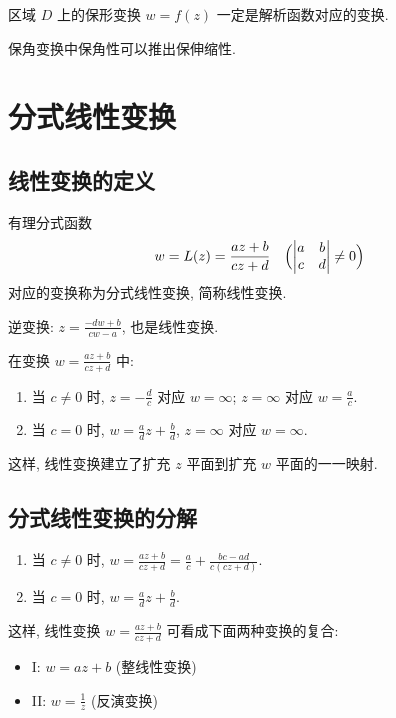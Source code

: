 \documentclass[theorem=false,mathfont=none,openany,sub3section]{easybook}
\begin{document}
\begin{theorem}[保形变换的解析性]
  区域 $D$ 上的保形变换 $w=f(z)$ 一定是解析函数对应的变换.
\end{theorem}

\begin{remark}
  保角变换中保角性可以推出保伸缩性.
\end{remark}

\newpage

\section{分式线性变换}

\subsection{线性变换的定义}

\begin{definition}
  有理分式函数
  \[
  w=L(z)=\frac{az+b}{cz+d}\quad\Bigl(\begin{vmatrix}a&b\\c&d\end{vmatrix}\neq0\Bigr)
  \]
  对应的变换称为分式线性变换, 简称线性变换.\par
  逆变换: $z=\frac{-dw+b}{cw-a}$, 也是线性变换.
\end{definition}

在变换 $w=\frac{az+b}{cz+d}$ 中:
\begin{enumerate}
  \item 当 $c\neq0$ 时, $z=-\frac{d}{c}$ 对应 $w=\infty$; $z=\infty$ 对应 $w=\frac{a}{c}$.
  \item 当 $c=0$ 时, $w=\frac{a}{d}z+\frac{b}{d}$, $z=\infty$ 对应 $w=\infty$.
\end{enumerate}
这样, 线性变换建立了扩充 $z$ 平面到扩充 $w$ 平面的一一映射.

\subsection{分式线性变换的分解}

\begin{enumerate}
  \item 当 $c\neq0$ 时, $w=\frac{az+b}{cz+d}=\frac{a}{c}+\frac{bc-ad}{c(cz+d)}$.
  \item 当 $c=0$ 时, $w=\frac{a}{d}z+\frac{b}{d}$.
\end{enumerate}
这样, 线性变换 $w=\frac{az+b}{cz+d}$ 可看成下面两种变换的复合:
\begin{itemize}
  \item I: $w=az+b$ (整线性变换)
  \item II: $w=\frac{1}{z}$ (反演变换)
\end{itemize}
\end{document}
